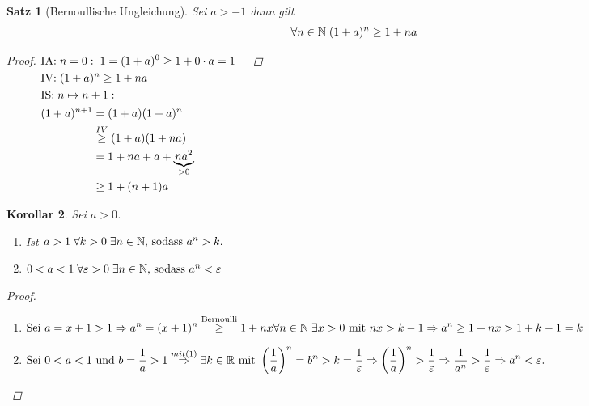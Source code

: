 \documentclass[a4paper,titlepage,oneside]{article}
\def\N{\ensuremath{\mathbb{N}} }
\def\R{\ensuremath{\mathbb{R}} }
\renewcommand{\epsilon}{\ensuremath{\varepsilon} }
\newcommand{\IA}[1][n=0]{\vspace{0.1pt}\ensuremath{\text{IA:}\sp#1:}}
\newcommand{\IV}{\vspace{0.1pt}\ensuremath{\text{IV:}\sp}}
\newcommand{\IS}[1][n \mapsto n+1]{\vspace{0.1pt}\ensuremath{\text{IS:}\sp#1:}}
\def\fa{\ensuremath{\forall}}
\def\sp{\hspace{0,1cm}}
\theoremstyle{thmstyle}
\theoremstyle{subthmstyle}
\newtheorem{subsatz}{Satz}[subsection]
\newtheorem{subkorr}[subsatz]{Korollar}
\begin{document}
\begin{subsatz}[Bernoullische Ungleichung]
Sei \(a > -1\) dann gilt \[\fa n \in \N \sp (1+a)^n \ge 1 + na \]
\begin{proof}
\begin{math}
\begin{aligned}[t]
	&\IA \sp 1 = (1 + a)^0 \ge 1 + 0\cdot a = 1						&&\\
	&\IV (1+a)^n \ge 1 + na								&&\\
	&\IS \\
	&\begin{aligned}[t]
		(1+a)^{n+1} 	&= (1+a)(1+a)^n 					&&\\
					&\overset{IV}{\ge} (1 + a)(1 + na) 		&&\\
					&= 1 + na + a + \underbrace{na^2}_{> 0} 	&&\\
					&\ge 1 + (n+1)a \end{aligned}
\end{aligned}\\
\end{math}
\end{proof}
\end{subsatz}

\begin{subkorr}
Sei \(a > 0\).
\begin{enumerate}[label=(\arabic*)]
	\item Ist \sp \(a > 1 \sp \forall k > 0 \sp \exists n \in \N \text{, sodass }a^n > k.\)
	\item \(0 < a < 1 \sp \forall \epsilon > 0 \sp \exists n \in \N \text{, sodass }a^n < \epsilon\)
\end{enumerate}
\begin{proof}\sp
\begin{enumerate}[label=(\arabic*)]
	\item \begin{math} \displaystyle
		\text{Sei } a = x + 1 > 1 \Rightarrow a^n = (x + 1)^n \overset{\text{Bernoulli}}{\ge} 1 + nx \\
		\forall n \in \N \sp \exists x > 0 \text{ mit } nx > k - 1 \Rightarrow a^n \ge 1 + nx > 1 + k -1 = k
		\end{math}
	\item \begin{math} \displaystyle
		\text{Sei } 0 < a < 1 \text{ und } b = \frac{1}{a} > 1 \overset{mit (1)}{\Rightarrow} \exists k \in \R \text{ mit }  \left(\frac{1}{a}\right)^n = b^n > k = \frac{1}{\epsilon}\\
		\Rightarrow  \left(\frac{1}{a}\right)^n > \frac{1}{\epsilon} \Rightarrow  \frac{1}{a^n} > \frac{1}{\epsilon} \Rightarrow a^n < \epsilon.
		\end{math}
\end{enumerate}
\end{proof}
\end{subkorr}
\newpage
\end{document}
